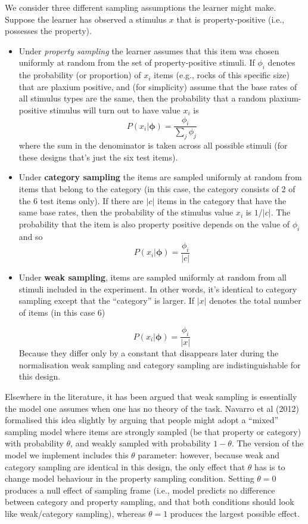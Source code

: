 \documentclass[
  english,
  doc]{apa6}
\begin{document}
\noindent
We consider three different sampling assumptions the learner might make. Suppose the learner has observed a stimulus \(x\) that is property-positive (i.e., possesses the property).

\begin{itemize}
\item
  Under \emph{property sampling} the learner assumes that this item was chosen uniformly at random from the set of property-positive stimuli. If \(\phi_i\) denotes the probability (or proportion) of \(x_i\) items (e.g., rocks of this specific size) that are plaxium positive, and (for simplicity) assume that the base rates of all stimulus types are the same, then the probability that a random plaxium-positive stimulus will turn out to have value \(x_i\) is
  \[
  P(x_i | \bm{\phi}) = \frac{\phi_i}{\sum_j \phi_j}
  \]
  where the sum in the denominator is taken across all possible stimuli (for these designs that's just the six test items).
\item
  Under \textbf{category sampling} the items are sampled uniformly at random from items that belong to the category (in this case, the category consists of 2 of the 6 test items only). If there are \(|c|\) items in the category that have the same base rates, then the probability of the stimulus value \(x_i\) is \(1/|c|\). The probability that the item is also property positive depends on the value of \(\phi_i\) and so
  \[
  P(x_i | \bm{\phi}) = \frac{\phi_i}{|c|}
  \]
\item
  Under \textbf{weak sampling}, items are sampled uniformly at random from all stimuli included in the experiment. In other words, it's identical to category sampling except that the \enquote{category} is larger. If \(|x|\) denotes the total number of items (in this case 6)

  \[
  P(x_i | \bm{\phi}) = \frac{\phi_i}{|x|}
  \]
  Because they differ only by a constant that disappears later during the normalisation weak sampling and category sampling are indistinguishable for this design.
\end{itemize}

\noindent
Elsewhere in the literature, it has been argued that weak sampling is essentially the model one assumes when one has no theory of the task. Navarro et al (2012) formalised this idea slightly by arguing that people might adopt a \enquote{mixed} sampling model where items are strongly sampled (be that property or category) with probability \(\theta\), and weakly sampled with probability \(1-\theta\). The version of the model we implement includes this \(\theta\) parameter: however, because weak and category sampling are identical in this design, the only effect that \(\theta\) has is to change model behaviour in the property sampling condition. Setting \(\theta = 0\) produces a null effect of sampling frame (i.e., model predicts no difference between category and property sampling, and that both conditions should look like weak/category sampling), whereas \(\theta = 1\) produces the largest possible effect.
\end{document}
